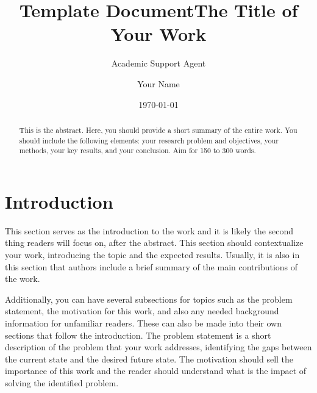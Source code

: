 \documentclass{article}
\title{Template Document}
\author{Academic Support Agent}
\date{\today}
\begin{document}
\maketitle

\begin{acronym}
\end{acronym}

\title{The Title of Your Work}

\author{Your Name}


\begin{abstract}
This is the abstract. Here, you should provide a short summary of the entire work. You should include the following elements: your research problem and objectives, your methods, your key results, and your conclusion. Aim for 150 to 300 words.
\end{abstract}


\maketitle

\section{Introduction}
\label{sec:intro}
This section serves as the introduction to the work and it is likely the second thing readers will focus on, after the abstract. This section should contextualize your work, introducing the topic and the expected results. Usually, it is also in this section that authors include a brief summary of the main contributions of the work.

Additionally, you can have several subsections for topics such as the problem statement, the motivation for this work, and also any needed background information for unfamiliar readers. These can also be made into their own sections that follow the introduction. The problem statement is a short description of the problem that your work addresses, identifying the gaps between the current state and the desired future state. The motivation should sell the importance of this work and the reader should understand what is the impact of solving the identified problem.
\end{document}
